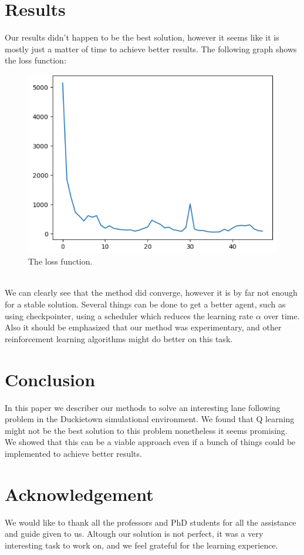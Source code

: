 \documentclass{article}
\begin{document}
\section{Results}
Our results didn't happen to be the best solution, however it seems like it is mostly just
a matter of time to achieve better results. The following graph shows the loss function:
\begin{figure}[h]
  \centering
  \includegraphics[scale=0.4]{LossFunction.png}
  \caption{The loss function.}
\end{figure}\\
We can clearly see that the method did converge, however it is by far not enough for a stable solution.
Several things can be done to get a better agent, such as using checkpointer, using a scheduler
which reduces the learning rate $\alpha$ over time. Also it should be emphasized that
our method was experimentary, and other reinforcement learning algorithms might
do better on this task.
\section{Conclusion}
In this paper we describer our methods to solve an interesting lane following problem
in the Duckietown simulational environment. We found that Q learning might not be the
best solution to this problem nonetheless it seems promising. We showed that this can
be a viable approach even if a bunch of things could be implemented to achieve better
results.

\section*{Acknowledgement}
We would like to thank all the professors and PhD students for all the assistance and
guide given to us. Altough our solution is not perfect, it was a very interesting task
to work on, and we feel grateful for the learning experience.

\nocite{*}


\end{document}
